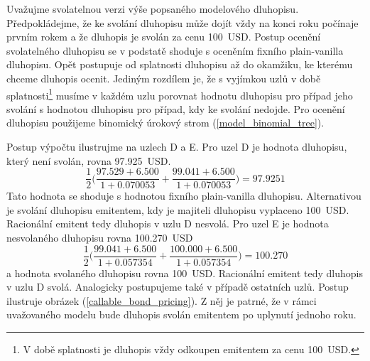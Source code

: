 \documentclass[a4paper]{book}
\begin{document}
Uvažujme svolatelnou verzi výše popsaného modelového dluhopisu. Předpokládejme, že ke svolání dluhopisu může dojít vždy na konci roku počínaje prvním rokem a že dluhopis je svolán za cenu 100~USD. Postup ocenění svolatelného dluhopisu se v podstatě shoduje s oceněním fixního plain-vanilla dluhopisu. Opět postupuje od splatnosti dluhopisu až do okamžiku, ke kterému chceme dluhopis ocenit. Jediným rozdílem je, že s vyjímkou uzlů v době splatnosti\footnote{V době splatnosti je dluhopis vždy odkoupen emitentem za cenu 100~USD.} musíme v každém uzlu porovnat hodnotu dluhopisu pro případ jeho svolání s hodnotou dluhopisu pro případ, kdy ke svolání nedojde. Pro ocenění dluhopisu použijeme binomický úrokový strom (\ref{model_binomial_tree}).

Postup výpočtu ilustrujme na uzlech D a E. Pro uzel D je hodnota dluhopisu, který není svolán, rovna 97.925~USD.
\begin{equation*}
\frac{1}{2}\Bigg(\frac{97.529 + 6.500}{1 + 0.070053} + \frac{99.041 + 6.500}{1 + 0.070053}\Bigg) = 97.9251
\end{equation*}
Tato hodnota se shoduje s hodnotou fixního plain-vanilla dluhopisu. Alternativou je svolání dluhopisu emitentem, kdy je majiteli dluhopisu vyplaceno 100~USD. Racionální emitent tedy dluhopis v uzlu D nesvolá. Pro uzel E je hodnota nesvolaného dluhopisu rovna 100.270~USD
\begin{equation*}
\frac{1}{2}\Bigg(\frac{99.041 + 6.500}{1 + 0.057354} + \frac{100.000 + 6.500}{1 + 0.057354}\Bigg) = 100.270
\end{equation*}
a hodnota svolaného dluhopisu rovna 100~USD. Racionální emitent tedy dluhopis v uzlu D svolá. Analogicky postupujeme také v případě ostatních uzlů. Postup ilustruje obrázek (\ref{callable_bond_pricing}). Z něj je patrné, že v rámci uvažovaného modelu bude dluhopis svolán emitentem po uplynutí jednoho roku.
\end{document}
